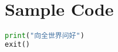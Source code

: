 
\section{Sample Code}

\begin{lstlisting}[language=python]
print("向全世界问好")
exit()
\end{lstlisting}

